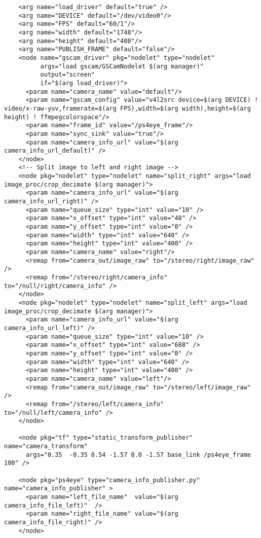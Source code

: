 \begin{center}
\begin{footnotesize}
\begin{verbatim}
    <arg name="load_driver" default="true" />
    <arg name="DEVICE" default="/dev/video0"/>
    <arg name="FPS" default="60/1"/>
    <arg name="width" default="1748"/>
    <arg name="height" default="408"/>
    <arg name="PUBLISH_FRAME" default="false"/>
    <node name="gscam_driver" pkg="nodelet" type="nodelet"
          args="load gscam/GSCamNodelet $(arg manager)"
          output="screen"
          if="$(arg load_driver)">
      <param name="camera_name" value="default"/>
      <param name="gscam_config" value="v4l2src device=$(arg DEVICE) ! video/x-raw-yuv,framerate=$(arg FPS),width=$(arg width),height=$(arg height) ! ffmpegcolorspace"/>
      <param name="frame_id" value="/ps4eye_frame"/>
      <param name="sync_sink" value="true"/>
      <param name="camera_info_url" value="$(arg camera_info_url_default)" />
    </node>
    <!-- Split image to left and right image -->
    <node pkg="nodelet" type="nodelet" name="split_right" args="load image_proc/crop_decimate $(arg manager)">
      <param name="camera_info_url" value="$(arg camera_info_url_right)" />
      <param name="queue_size" type="int" value="10" />
      <param name="x_offset" type="int" value="48" />
      <param name="y_offset" type="int" value="0" />
      <param name="width" type="int" value="640" />
      <param name="height" type="int" value="400" />
      <param name="camera_name" value="right"/>
      <remap from="camera_out/image_raw" to="/stereo/right/image_raw" />
      <remap from="/stereo/right/camera_info" to="/null/right/camera_info" />
    </node>
    <node pkg="nodelet" type="nodelet" name="split_left" args="load image_proc/crop_decimate $(arg manager)">
      <param name="camera_info_url" value="$(arg camera_info_url_left)" />
      <param name="queue_size" type="int" value="10" />
      <param name="x_offset" type="int" value="688" />
      <param name="y_offset" type="int" value="0" />
      <param name="width" type="int" value="640" />
      <param name="height" type="int" value="400" />
      <param name="camera_name" value="left"/>
      <remap from="camera_out/image_raw" to="/stereo/left/image_raw" />
      <remap from="/stereo/left/camera_info" to="/null/left/camera_info" />
    </node>

    <node pkg="tf" type="static_transform_publisher" name="camera_transform"
      args="0.35  -0.35 0.54 -1.57 0.0 -1.57 base_link /ps4eye_frame 100" />

    <node pkg="ps4eye" type="camera_info_publisher.py" name="camera_info_publisher" >
      <param name="left_file_name"  value="$(arg camera_info_file_left)"  />
      <param name="right_file_name" value="$(arg camera_info_file_right)" />
    </node>


\end{verbatim}
\end{footnotesize}
\end{center}
